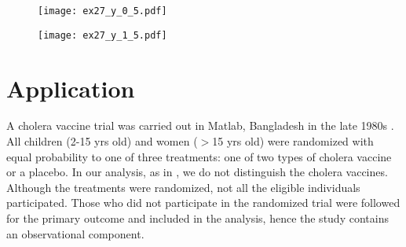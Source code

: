 \documentclass[oupdraft]{biostatistics}
\begin{document}
\begin{figure}[h!]
\centering
\label{fig:simulation_results_0}
\texttt{[image: ex27\_y\_0\_5.pdf]}
\end{figure}

\begin{figure}[h!]
\centering
\label{fig:simulation_results_1}
\texttt{[image: ex27\_y\_1\_5.pdf]}
\end{figure}

%
%
%

\vspace{-0.4cm}
\section{Application}\label{sec: DR_dia}
A cholera vaccine trial was carried out in Matlab, Bangladesh in the late 1980s \citep{clemens1988field}. All children (2-15 yrs old) and women ($>$15 yrs old) were randomized with equal probability to one of three treatments: one of two types of cholera vaccine or a placebo. In our analysis, as in \citet{PerezHeydrich2014interference}, we do not distinguish the cholera vaccines. Although the treatments were randomized, not all the eligible individuals participated. Those who did not participate in the randomized trial were followed for the primary outcome and included in the analysis, hence the study contains an observational component.
\end{document}
